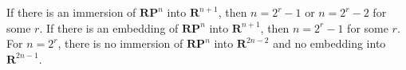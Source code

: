 If there is an immersion of $\mathbf{RP}^n$ into $\mathbf{R}^{n+1}$, then $n = 2^r - 1$ or $n = 2^r - 2$ for some $r$. If there is an embedding of $\mathbf{RP}^n$ into $\mathbf{R}^{n+1}$, then $n = 2^r - 1$ for some $r$. For $n = 2^r$, there is no immersion of $\mathbf{RP}^n$ into $\mathbf{R}^{2n-2}$ and no embedding into $\mathbf{R}^{2n-1}$.
